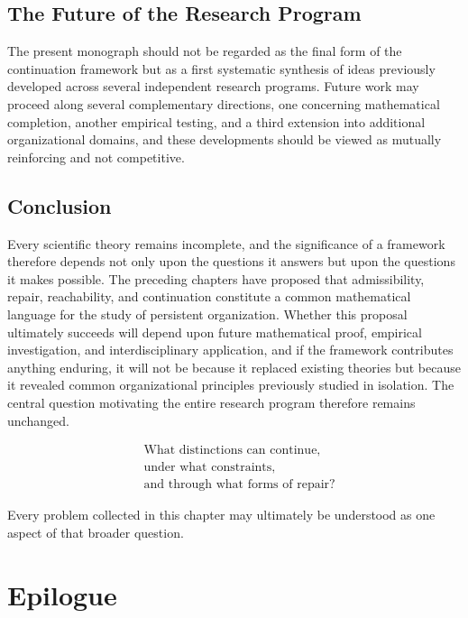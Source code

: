 \documentclass[11pt,oneside]{book}
\numberwithin{equation}{chapter}
\theoremstyle{definition}
\theoremstyle{plain}
\begin{document}
\section{The Future of the Research Program}

The present monograph should not be regarded as the final form of the continuation framework but as a first systematic synthesis of ideas previously developed across several independent research programs. Future work may proceed along several complementary directions, one concerning mathematical completion, another empirical testing, and a third extension into additional organizational domains, and these developments should be viewed as mutually reinforcing and not competitive.

\section{Conclusion}

Every scientific theory remains incomplete, and the significance of a framework therefore depends not only upon the questions it answers but upon the questions it makes possible. The preceding chapters have proposed that admissibility, repair, reachability, and continuation constitute a common mathematical language for the study of persistent organization. Whether this proposal ultimately succeeds will depend upon future mathematical proof, empirical investigation, and interdisciplinary application, and if the framework contributes anything enduring, it will not be because it replaced existing theories but because it revealed common organizational principles previously studied in isolation. The central question motivating the entire research program therefore remains unchanged.

\[
\boxed{
\begin{aligned}
&\text{What distinctions can continue,}\\
&\text{under what constraints,}\\
&\text{and through what forms of repair?}
\end{aligned}
}
\]

Every problem collected in this chapter may ultimately be understood as one
aspect of that broader question.

\chapter*{Epilogue}
\end{document}
